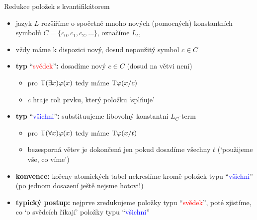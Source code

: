 \documentclass{beamer}
\begin{document}
\begin{frame}{Redukce položek s kvantifikátorem}

    \begin{itemize}
        \item jazyk $L$ rozšíříme o spočetně mnoho \alert{nových (pomocných) konstantních symbolů} $C=\{c_0,c_1,c_2,\dots\}$, 
        označíme \alert{$L_C$}
        \item vždy máme k dispozici \alert{nový}, dosud \alert{nepoužitý} symbol $c\in C$
        
        \medskip

        \item \textbf{typ} ``\textcolor{red}{svědek}''\textbf{:} dosadíme \alert{nový} $c\in C$ (dosud na větvi není)
        \begin{itemize}
            \item pro $\mathrm{T}(\exists x)\varphi(x)$ tedy máme $\mathrm{T}\varphi(x/c)$
            \item $c$ hraje roli prvku, který položku `splňuje'
        \end{itemize}

        \medskip

        \item \textbf{typ} ``\textcolor{blue}{všichni}''\textbf{:} substituujeme \alert{libovolný} konstantní $L_C$-term
        \begin{itemize}
            \item pro $\mathrm{T}(\forall x)\varphi(x)$ tedy máme $\mathrm{T}\varphi(x/t)$
            \item bezesporná větev je \alert{dokončená} jen pokud \alert{dosadíme všechny $t$} (`použijeme vše, co víme')
        \end{itemize}

        \medskip

        \item \textbf{konvence:} kořeny atomických tabel nekreslíme \alert{kromě položek typu} ``\textcolor{blue}{všichni}'' (po jednom dosazení ještě nejsme hotovi!)
        
        \medskip
        
        \item \textbf{typický postup:} nejprve zredukujeme položky typu ``\textcolor{red}{svědek}'', poté zjistíme, co `\alert{o svědcích říkají}' položky typu ``\textcolor{blue}{všichni}'' 
        
    \end{itemize}

\end{frame}
\end{document}
